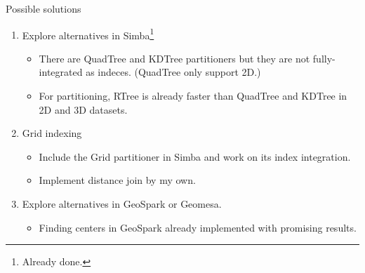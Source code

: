 \documentclass{beamer}
\theoremstyle{definition}
\begin{document}
\begin{frame}{Possible solutions}
    \begin{enumerate}
        \item Explore alternatives in Simba\footnote{Already done.}
        \begin{itemize}
            \item There are QuadTree and KDTree partitioners but they are not fully-integrated as indeces. (QuadTree only support 2D.)
            \item For partitioning, RTree is already faster than QuadTree and KDTree in 2D and 3D datasets.   
        \end{itemize}

        \item Grid indexing
        \begin{itemize}
            \item Include the Grid partitioner in Simba and work on its index integration.
            \item Implement distance join by my own.
        \end{itemize}
        
        \item Explore alternatives in GeoSpark or Geomesa.
        \begin{itemize}
            \item Finding centers in GeoSpark already implemented with promising results.
        \end{itemize}
    \end{enumerate}
\end{frame}

% 
% 
\end{document}
